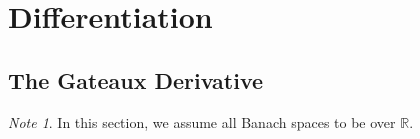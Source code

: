 \documentclass[12pt]{amsart}
\theoremstyle{definition}
\newtheorem{defn}[definition]{Definition}
\theoremstyle{remark}
\newtheorem{note}[remark]{Note}
\theoremstyle{definition}
\newcommand{\del}{\delta}
\newcommand{\N}{\mathbb{N}}
\newcommand{\R}{\mathbb{R}}
\begin{document}
%
%


	
	
	
	
	
	
	
	
	
	
	
	
	
	\newpage
	\section{Differentiation}
	
	\subsection{The Gateaux Derivative}
	
	\begin{note}
	In this section, we assume all Banach spaces to be over $\R$. 
	\end{note}
	
\end{document}
